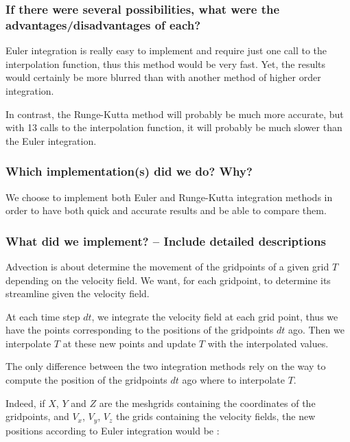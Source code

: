 \documentclass[accepted,single]{gipaper}
\begin{document}
\subsubsection{If there were several possibilities,
what were the advantages/disadvantages of each? }

Euler integration is really easy to implement and require just one call to the interpolation function, thus this method would be very fast. Yet, the results would certainly be more blurred than with another method of higher order integration.

In contrast, the Runge-Kutta method will probably be much more accurate, but with 13 calls to the interpolation function, it will probably be much slower than the Euler integration.

\subsubsection{Which implementation(s) did we do? Why?}

We choose to implement both Euler and Runge-Kutta integration methods in order to have both quick and accurate results and be able to compare them.

\subsubsection{What did we implement? -- Include detailed descriptions}

Advection is about determine the movement of the gridpoints of a given grid $T$ depending on the velocity field. We want, for each gridpoint, to determine its streamline given the velocity field. 

At each time step $dt$, we integrate the velocity field at each grid point, thus we have the points corresponding to the positions of the gridpoints $dt$ ago. Then we interpolate $T$ at these new points and update $T$  with the interpolated values.

The only difference between the two integration methods rely on the way to compute the position of the gridpoints $dt$ ago where to interpolate $T$. 

Indeed, if $X$, $Y$ and $Z$ are the meshgrids containing the coordinates of the gridpoints, and $V_x$, $V_y$, $V_z$ the grids containing the velocity fields, the new positions according to Euler integration would be :
\end{document}
